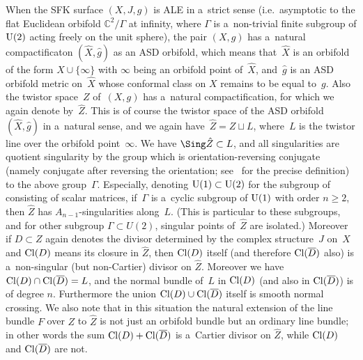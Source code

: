 When the SFK surface $(X,J,g)$ is ALE in a~strict sense (i.e.\ asymptotic to the f\/lat Euclidean orbifold
$\mathbb{C}^2/\Gamma$ at inf\/inity, where $\Gamma$ is a~non-trivial f\/inite subgroup of ${\rm{U}}(2)$ acting freely on
the unit sphere), the pair $(X,g)$ has a~natural compactif\/icaton $(\hat X, \hat g)$ as an ASD orbifold, which means
that~$\hat X$ is an orbifold of the form $X\cup\{\infty\}$ with $\infty$ being an orbifold point of~$\hat X$, and~$\hat
g$ is an ASD orbifold metric on~$\hat X$ whose conformal class on $X$ remains to be equal to~$g$.
Also the twistor space~$Z$ of~$(X,g)$ has a~natural compactif\/ication, for which we again denote by~$\hat Z$.
This is of course the twistor space of the ASD orbifold~$(\hat X,\hat g)$ in a~natural sense, and we again have~$\hat Z
= Z\sqcup L$, where~$L$ is the twistor line over the orbifold point~$\infty$.
We have $\Sing\hat Z\subset L$, and all singularities are quotient singularity by the group which is
orientation-reversing conjugate (namely conjugate after reversing the orientation; see~\cite[Def\/inition~1.4]{V} for the precise
def\/inition) to the above group~$\Gamma$.
Especially, denoting ${\rm{U}}(1)\subset{\rm{U}}(2)$ for the subgroup of consisting of scalar matrices, if~$\Gamma$ is
a~cyclic subgroup of ${\rm{U}}(1)$ with order $n\ge 2$, then $\hat Z$ has $A_{n-1}$-singularities along~$L$.
(This is particular to these subgroups, and for other subgroup $\Gamma\subset U(2)$, singular points of~$\hat Z$ are
isolated.) Moreover if $D\subset Z$ again denotes the divisor determined by the complex structure~$J$ on~$X$ and
${\rm{Cl}}(D)$ means its closure in $\hat Z$, then ${\rm{Cl}}(D)$ itself (and therefore ${\rm{Cl}}(\overline D)$ also)
is a~non-singular (but non-Cartier) divisor on $\hat Z$.
Moreover we have ${\rm{Cl}}(D)\cap {\rm{Cl}}(\overline D)=L$, and the normal bundle of~$L$ in ${\rm{Cl}}(D)$ (and also
in ${\rm{Cl}}(\overline D)$) is of degree $n$.
Furthermore the union ${\rm{Cl}}(D) \cup {\rm{Cl}}(\overline D)$ itself is smooth normal crossing.
We also note that in this situation the natural extension of the line bundle $F$ over $Z$ to $\hat Z$ is not just an
orbifold bundle but an ordinary line bundle; in other words the sum ${\rm{Cl}}(D) + {\rm{Cl}}(\overline D)$ is a~Cartier
divisor on $\hat Z$, while ${\rm{Cl}}(D)$ and ${\rm{Cl}}(\overline D)$ are not.

